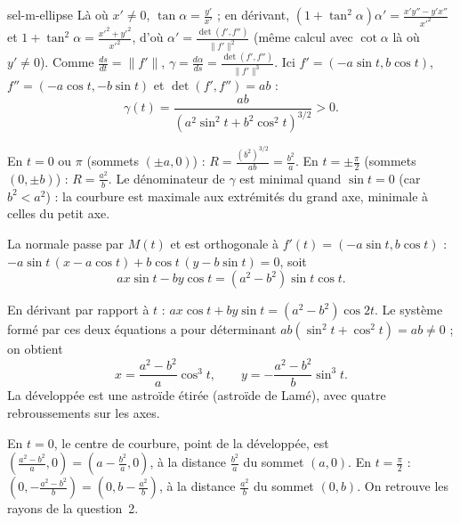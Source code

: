 \begin{corrige}{sel-m-ellipse}
 Là où $x'\neq0$, $\tan\alpha=\frac{y'}{x'}$ ; en dérivant, $(1+\tan^2\alpha)\alpha'=\frac{x'y''-y'x''}{x'^2}$ et $1+\tan^2\alpha=\frac{x'^2+y'^2}{x'^2}$, d'où $\alpha'=\frac{\det(f',f'')}{\|f'\|^2}$ (même calcul avec $\cot\alpha$ là où $y'\neq0$). Comme $\frac{ds}{dt}=\|f'\|$, $\gamma=\frac{d\alpha}{ds}=\frac{\det(f',f'')}{\|f'\|^3}$. Ici $f'=(-a\sin t,b\cos t)$, $f''=(-a\cos t,-b\sin t)$ et $\det(f',f'')=ab$ :
\[\gamma(t)=\frac{ab}{(a^2\sin^2t+b^2\cos^2t)^{3/2}}>0.\]

 En $t=0$ ou $\pi$ (sommets $(\pm a,0)$) : $R=\frac{(b^2)^{3/2}}{ab}=\frac{b^2}a$. En $t=\pm\frac\pi2$ (sommets $(0,\pm b)$) : $R=\frac{a^2}b$. Le dénominateur de $\gamma$ est minimal quand $\sin t=0$ (car $b^2<a^2$) : la courbure est maximale aux extrémités du grand axe, minimale à celles du petit axe.

 La normale passe par $M(t)$ et est orthogonale à $f'(t)=(-a\sin t,b\cos t)$ : $-a\sin t\,(x-a\cos t)+b\cos t\,(y-b\sin t)=0$, soit
\[ax\sin t-by\cos t=(a^2-b^2)\sin t\cos t.\]

 En dérivant par rapport à $t$ : $ax\cos t+by\sin t=(a^2-b^2)\cos2t$. Le système formé par ces deux équations a pour déterminant $ab(\sin^2t+\cos^2t)=ab\neq0$ ; on obtient
\[x=\frac{a^2-b^2}a\cos^3t,\qquad y=-\frac{a^2-b^2}b\sin^3t.\]
La développée est une astroïde étirée (astroïde de Lamé), avec quatre rebroussements sur les axes.

 En $t=0$, le centre de courbure, point de la développée, est $\left(\frac{a^2-b^2}a,0\right)=\left(a-\frac{b^2}a,0\right)$, à la distance $\frac{b^2}a$ du sommet $(a,0)$. En $t=\frac\pi2$ : $\left(0,-\frac{a^2-b^2}b\right)=\left(0,b-\frac{a^2}b\right)$, à la distance $\frac{a^2}b$ du sommet $(0,b)$. On retrouve les rayons de la question~2.
\end{corrige}

